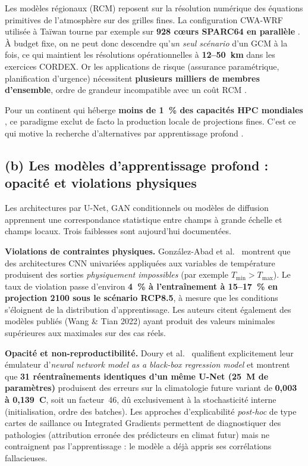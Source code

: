 \documentclass[12pt,a4paper]{article}
\begin{document}
Les modèles régionaux (RCM) reposent sur la résolution numérique des équations primitives de l'atmosphère sur des grilles fines. La configuration CWA-WRF utilisée à Taïwan tourne par exemple sur \textbf{928 c\oe urs SPARC64 en parallèle} \cite{Mardani2024}. À budget fixe, on ne peut donc descendre qu'\emph{un seul scénario} d'un GCM à la fois, ce qui maintient les résolutions opérationnelles à \textbf{12--50~km} dans les exercices CORDEX. Or les applications de risque (assurance paramétrique, planification d'urgence) nécessitent \textbf{plusieurs milliers de membres d'ensemble}, ordre de grandeur incompatible avec un coût RCM \cite{Hobeichi2023}.

Pour un continent qui héberge \textbf{moins de 1~\% des capacités HPC mondiales} \cite{Bachmann2025}, ce paradigme exclut de facto la production locale de projections fines. C'est ce qui motive la recherche d'alternatives par apprentissage profond \cite{Rampal2024,Doury2024}.

\subsection*{(b) Les modèles d'apprentissage profond : opacité et violations physiques}

Les architectures par U-Net, GAN conditionnels ou modèles de diffusion apprennent une correspondance statistique entre champs à grande échelle et champs locaux. Trois faiblesses sont aujourd'hui documentées.

\textbf{Violations de contraintes physiques.} González-Abad et al.~\cite{GonzalezAbad2023AAAI} montrent que des architectures CNN univariées appliquées aux variables de température produisent des sorties \emph{physiquement impossibles} (par exemple $T_{\min} > T_{\max}$). Le taux de violation passe d'environ \textbf{4~\% à l'entraînement à 15--17~\% en projection 2100 sous le scénario RCP8.5}, à mesure que les conditions s'éloignent de la distribution d'apprentissage. Les auteurs citent également des modèles publiés (Wang \& Tian 2022) ayant produit des valeurs minimales supérieures aux maximales sur des cas réels.

\textbf{Opacité et non-reproductibilité.} Doury et al.~\cite{Doury2023} qualifient explicitement leur émulateur d'\og{}\emph{neural network model as a black-box regression model}\fg{} et montrent que \textbf{31 réentraînements identiques d'un même U-Net (25~M de paramètres)} produisent des erreurs sur la climatologie future variant de \textbf{0,003 à 0,139~\textdegree C}, soit un facteur~46, dû exclusivement à la stochasticité interne (initialisation, ordre des batches). Les approches d'explicabilité \emph{post-hoc} de type cartes de saillance ou Integrated Gradients \cite{GonzalezAbad2023XAI} permettent de diagnostiquer des pathologies (attribution erronée des prédicteurs en climat futur) mais ne contraignent pas l'apprentissage : le modèle a déjà appris ses corrélations fallacieuses.
\end{document}
